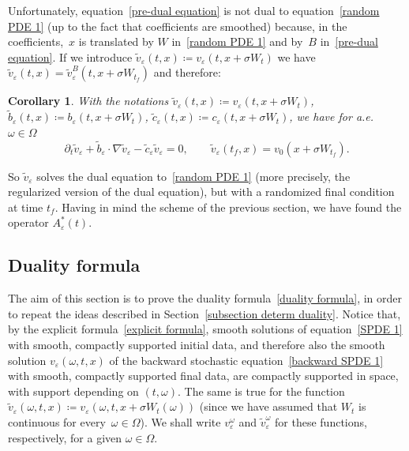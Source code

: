 \documentclass[a4paper,10pt]{article}
\newtheorem{corollary}[theorem]{Corollary}
\newcommand\1{\mathbbm{1}}
\newcommand{\eps}{\varepsilon}
\numberwithin{equation}{section}
\begin{document}
Unfortunately, equation~\eqref{pre-dual equation} is not dual to equation~\eqref{random PDE 1} (up to the fact that coefficients are smoothed) because, in the coefficients,~$x$ is translated by $W$ in~\eqref{random PDE 1} and by~$B$ in~\eqref{pre-dual equation}. If we introduce $\widetilde{v}_{\eps}(t,x) \coloneqq v_{\eps}(t,x+\sigma W_{t}) $ we have
$\widetilde{v}_{\eps}(t,x)  =\widetilde{v}_{\eps}^{B}(t,x+\sigma W_{t_{f}})$ and therefore:

\begin{corollary}\label{SPDE PDE backward}
With the notations $\widetilde{v}_{\eps}( t,x)\coloneqq v_{\eps}(t,x+\sigma W_{t})$, $\widetilde{b}_{\eps}(t,x)\coloneqq b_{\eps}(t,x+\sigma W_{t})$, $\widetilde{c}_{\eps}(t,x)\coloneqq c_{\eps}(t,x+\sigma W_{t})$, we have for a.e.~$\omega\in\Omega$
\begin{equation}
\partial_t \widetilde{v}_{\eps} +\widetilde{b}_{\eps}\cdot\nabla\widetilde{v}_{\eps}-\widetilde{c}_{\eps}\widetilde{v}_{\eps}=0,\qquad\widetilde{v}_{\eps} (t_{f},x)
=v_{0}(x+\sigma W_{t_{f}}) . \label{dual equation}
\end{equation}
\end{corollary}

So $\widetilde{v}_{\eps}$ solves the dual equation to~\eqref{random PDE 1} (more precisely, the regularized version of the dual equation), but with a randomized final condition at time $t_{f}$. Having in mind the scheme of the previous section, we have found the operator $A^*_\eps(t)$.

\subsection{Duality formula}

The aim of this section is to prove the duality formula~\eqref{duality formula}, in order to repeat the ideas described in Section~\ref{subsection determ duality}. Notice that, by the explicit formula~\eqref{explicit formula}, smooth solutions of equation~\eqref{SPDE 1} with smooth, compactly supported initial data, and therefore also the smooth solution $v_{\eps}(\omega,t,x)$ of the backward stochastic equation~\eqref{backward SPDE 1} with smooth, compactly supported final data, are compactly supported in space, with support depending on $(t,\omega)$. The same is true for the function $\widetilde{v}_{\eps}(\omega,t,x)  \coloneqq v_{\eps}(\omega,t,x+\sigma W_{t}(\omega))$ (since we have assumed that $W_{t}$ is continuous for every~$\omega \in \Omega$). We shall write $v_{\eps}^\omega$ and $\widetilde{v}_{\eps}^\omega$ for these functions, respectively, for a given $\omega\in\Omega$.
\end{document}
